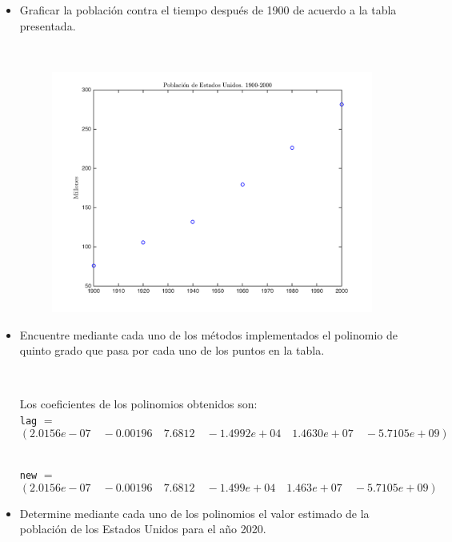 \documentclass[11pt, spanish]{article}
\begin{document}
\begin{itemize}

\item Graficar la población contra el tiempo después de 1900 de acuerdo a la tabla presentada.

\

\begin{figure}[H]
\centering
	\includegraphics[scale=0.8]{data/img/populationplot}
\end{figure}

\item Encuentre mediante cada uno de los métodos implementados el polinomio de quinto grado que pasa por cada uno de los puntos en la tabla.

\

Los coeficientes de los polinomios obtenidos son:\\

\texttt{lag} $ = $
$$\left(2.0156e-07 \quad -0.00196 \quad 7.6812 \quad -1.4992e+04 \quad 1.4630e+07 \quad -5.7105e+09\right)
$$\

\texttt{new} $ = $
$$\left(2.0156e-07 \quad -0.00196 \quad 7.6812 \quad -1.499e+04 \quad 1.463e+07 \quad -5.7105e+09\right)
$$

\item Determine mediante cada uno de los polinomios el valor estimado de la población de los Estados Unidos para el año 2020.


\end{itemize}
\end{document}
